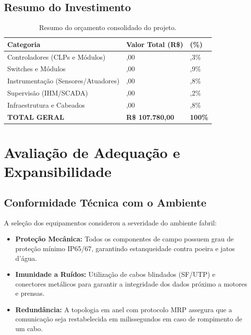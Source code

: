 \documentclass[12pt,a4paper]{article}
\begin{document}
\subsection{Resumo do Investimento}

\begin{table}[h]
\centering
\begin{tabular}{@{}p{6cm}>{\raggedleft\arraybackslash}p{4cm}>{\raggedleft\arraybackslash}p{3cm}@{}}
\toprule
\textbf{Categoria} & \textbf{Valor Total (R\$)} & \textbf{(\%)} \\
\midrule
Controladores (CLPs e Módulos) & 16.430,00 & 15,3\% \\
\midrule
Switches e Módulos & 19.300,00 & 17,9\% \\
\midrule
Instrumentação (Sensores/Atuadores) & 22.390,00 & 20,8\% \\
\midrule
Supervisão (IHM/SCADA) & 27.100,00 & 25,2\% \\
\midrule
Infraestrutura e Cabeados & 22.560,00 & 20,8\% \\
\midrule
\textbf{TOTAL GERAL} & \textbf{R\$ 107.780,00} & \textbf{100\%} \\
\bottomrule
\end{tabular}
\caption{Resumo do orçamento consolidado do projeto.}
\end{table}

\section{Avaliação de Adequação e Expansibilidade}

\subsection{Conformidade Técnica com o Ambiente}
A seleção dos equipamentos considerou a severidade do ambiente fabril:
\begin{itemize}
    \item \textbf{Proteção Mecânica:} Todos os componentes de campo possuem grau de proteção mínimo IP65/67, garantindo estanqueidade contra poeira e jatos d'água.
    \item \textbf{Imunidade a Ruídos:} Utilização de cabos blindados (SF/UTP) e conectores metálicos para garantir a integridade dos dados próximo a motores e prensas.
    \item \textbf{Redundância:} A topologia em anel com protocolo MRP assegura que a comunicação seja restabelecida em milissegundos em caso de rompimento de um cabo.
\end{itemize}
\end{document}
